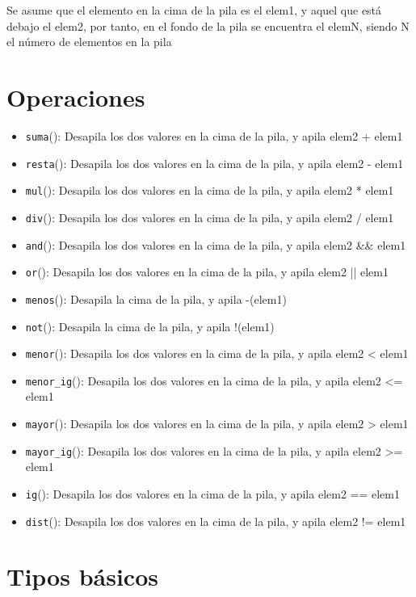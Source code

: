 Se asume que el elemento en la cima de la pila es el elem1, y aquel que está debajo el elem2, por tanto, en el fondo de la pila se encuentra el elemN, siendo N el número de elementos en la pila

\section{Operaciones}

\begin{itemize}
    \item \texttt{suma}(): Desapila los dos valores en la cima de la pila, y apila elem2 + elem1
    \item \texttt{resta}(): Desapila los dos valores en la cima de la pila, y apila elem2 - elem1
    \item \texttt{mul}(): Desapila los dos valores en la cima de la pila, y apila elem2 * elem1
    \item \texttt{div}(): Desapila los dos valores en la cima de la pila, y apila elem2 / elem1
    \item \texttt{and}(): Desapila los dos valores en la cima de la pila, y apila elem2 \&\& elem1
    \item \texttt{or}(): Desapila los dos valores en la cima de la pila, y apila elem2 || elem1
    \item \texttt{menos}(): Desapila la cima de la pila, y apila -(elem1)
    \item \texttt{not}(): Desapila la cima de la pila, y apila !(elem1)
    \item \texttt{menor}(): Desapila los dos valores en la cima de la pila, y apila elem2 < \; elem1
    \item \texttt{menor\_ig}(): Desapila los dos valores en la cima de la pila, y apila elem2 <= elem1
    \item \texttt{mayor}(): Desapila los dos valores en la cima de la pila, y apila elem2 > \; elem1
    \item \texttt{mayor\_ig}(): Desapila los dos valores en la cima de la pila, y apila elem2 >= elem1
    \item \texttt{ig}(): Desapila los dos valores en la cima de la pila, y apila elem2 == elem1
    \item \texttt{dist}(): Desapila los dos valores en la cima de la pila, y apila elem2 != elem1
\end{itemize}

\section{Tipos básicos}

